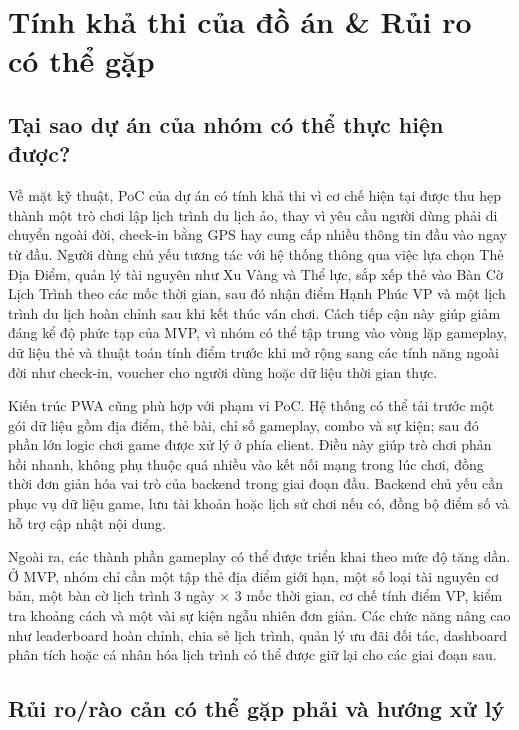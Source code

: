 \newpage

\chapter{Tính khả thi của đồ án \& Rủi ro có thể gặp}

\section{Tại sao dự án của nhóm có thể thực hiện được?}

Về mặt kỹ thuật, PoC của dự án có tính khả thi vì cơ chế hiện tại được thu hẹp thành một trò chơi lập lịch trình du lịch ảo, thay vì yêu cầu người dùng phải di chuyển ngoài đời, check-in bằng GPS hay cung cấp nhiều thông tin đầu vào ngay từ đầu. Người dùng chủ yếu tương tác với hệ thống thông qua việc lựa chọn Thẻ Địa Điểm, quản lý tài nguyên như Xu Vàng và Thể lực, sắp xếp thẻ vào Bàn Cờ Lịch Trình theo các mốc thời gian, sau đó nhận điểm Hạnh Phúc VP và một lịch trình du lịch hoàn chỉnh sau khi kết thúc ván chơi. Cách tiếp cận này giúp giảm đáng kể độ phức tạp của MVP, vì nhóm có thể tập trung vào vòng lặp gameplay, dữ liệu thẻ và thuật toán tính điểm trước khi mở rộng sang các tính năng ngoài đời như check-in, voucher cho người dùng hoặc dữ liệu thời gian thực.

Kiến trúc PWA cũng phù hợp với phạm vi PoC. Hệ thống có thể tải trước một gói dữ liệu gồm địa điểm, thẻ bài, chỉ số gameplay, combo và sự kiện; sau đó phần lớn logic chơi game được xử lý ở phía client. Điều này giúp trò chơi phản hồi nhanh, không phụ thuộc quá nhiều vào kết nối mạng trong lúc chơi, đồng thời đơn giản hóa vai trò của backend trong giai đoạn đầu. Backend chủ yếu cần phục vụ dữ liệu game, lưu tài khoản hoặc lịch sử chơi nếu có, đồng bộ điểm số và hỗ trợ cập nhật nội dung.

Ngoài ra, các thành phần gameplay có thể được triển khai theo mức độ tăng dần. Ở MVP, nhóm chỉ cần một tập thẻ địa điểm giới hạn, một số loại tài nguyên cơ bản, một bàn cờ lịch trình 3 ngày × 3 mốc thời gian, cơ chế tính điểm VP, kiểm tra khoảng cách và một vài sự kiện ngẫu nhiên đơn giản. Các chức năng nâng cao như leaderboard hoàn chỉnh, chia sẻ lịch trình, quản lý ưu đãi đối tác, dashboard phân tích hoặc cá nhân hóa lịch trình có thể được giữ lại cho các giai đoạn sau.

\section{Rủi ro/rào cản có thể gặp phải và hướng xử lý}


